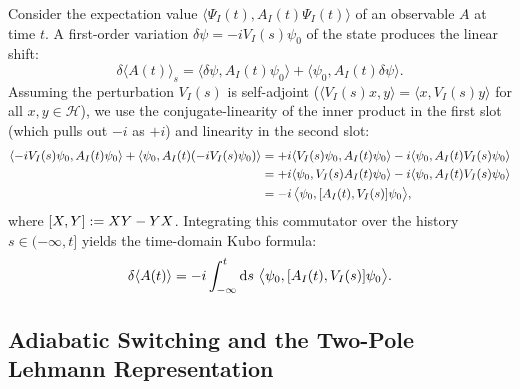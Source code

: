 \documentclass[11pt, a4paper]{article}
\numberwithin{equation}{section}
\begin{document}
Consider the expectation value $\langle \Psi_I(t), A_I(t) \Psi_I(t) \rangle$ of an observable $A$ at time $t$. A first-order variation $\delta\psi = -i V_I(s) \psi_0$ of the state produces the linear shift:
\begin{equation}
  \delta\langle A(t) \rangle_s = \langle \delta\psi, A_I(t) \psi_0 \rangle + \langle \psi_0, A_I(t) \delta\psi \rangle.
\end{equation}
Assuming the perturbation $V_I(s)$ is self-adjoint ($\langle V_I(s) x, y \rangle = \langle x, V_I(s) y \rangle$ for all $x, y \in \mathcal{H}$), we use the conjugate-linearity of the inner product in the first slot (which pulls out $-i$ as $+i$) and linearity in the second slot:
\begin{align}
  \langle -i V_I(s) \psi_0, A_I(t) \psi_0 \rangle + \langle \psi_0, A_I(t) (-i V_I(s) \psi_0) \rangle
  &= +i \langle V_I(s) \psi_0, A_I(t) \psi_0 \rangle - i \langle \psi_0, A_I(t) V_I(s) \psi_0 \rangle \nonumber \\
  &= +i \langle \psi_0, V_I(s) A_I(t) \psi_0 \rangle - i \langle \psi_0, A_I(t) V_I(s) \psi_0 \rangle \nonumber \\
  &= -i \, \big\langle \psi_0, \comm{A_I(t)}{V_I(s)} \psi_0 \big\rangle, \label{eq:kubo_commutator}
\end{align}
where $\comm{X}{Y} := X Y - Y X$. Integrating this commutator over the history $s \in (-\infty, t]$ yields the time-domain Kubo formula:
\begin{equation}
  \delta\langle A(t) \rangle = -i \int_{-\infty}^{t} \dd{s} \, \big\langle \psi_0, \comm{A_I(t)}{V_I(s)} \psi_0 \big\rangle.
\end{equation}

\subsection{Adiabatic Switching and the Two-Pole Lehmann Representation}
\end{document}
